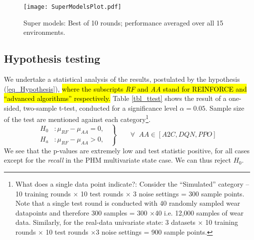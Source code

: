 \documentclass[referee, sn-mathphys-num]{sn-jnl}
\newcommand{\hlc}[2][cyan!15]{{\colorlet{foo}{#1}\sethlcolor{foo}\hl{#2}}}
\begin{document}
	\begin{figure}[htb]
		\centering
		\texttt{[image: SuperModelsPlot.pdf]}  
		\caption{Super models: Best of 10 rounds; performance averaged over all 15 environments.}
		\label{fig_supermodels}
	\end{figure}
	
	\subsection{Hypothesis testing}\label{sec_Hypothesistesting}
	We undertake a statistical analysis of the results, postulated by the hypothesis (\ref{eq_Hypothesis}), \hlc{where the subscripts \textit{RF} and \textit{AA} stand for REINFORCE and ``advanced algorithms'' respectively.} Table \ref{tbl_ttest} shows the result of a one-sided, two-sample t-test, conducted for a significance level $\alpha=0.05$. Sample size of the test are mentioned against each category\footnote{What does a single data point indicate?: Consider the ``Simulated'' category -- 10 training rounds $\times$ 10 test rounds $\times$ 3 noise settings = 300 sample points. Note that a single test round is conducted with 40 randomly sampled wear datapoints and therefore 300 samples = 300 $\times$40 i.e. 12,000 samples of wear data. Similarly, for the real-data univariate state: 3 datasets $\times$ 10 training rounds $\times$ 10 test rounds $\times$3 noise settings = 900 sample points.}.
	\begin{equation}
		\left.\begin{aligned}
			H_0 & : \mu_{RF} - \mu_{AA} = 0,\;\; \\
			H_a & : \mu_{RF} - \mu_{AA} > 0, \;\;
		\end{aligned}
		\right\}
		\qquad \forall \;\; \text{$AA \in[A2C, DQN, PPO]$}
		\label{eq_Hypothesis}
	\end{equation}
	We see that the p-values are extremely low and test statistic positive, for all cases except for the \textit{recall} in the PHM multivariate state case. We can thus reject $H_0$.
\end{document}
